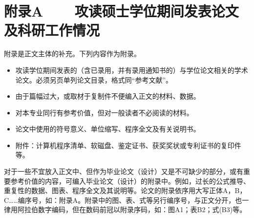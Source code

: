 \chapter*{附录A~~~~攻读硕士学位期间发表论文及科研工作情况}


附录是正文主体的补充。下列内容作为附录。

\begin{itemize}
	\item 攻读学位期间发表的（含已录用，并有录用通知书的）与学位论文相关的学术论文。必须另页单列论文目录，格式同“参考文献”。
	\item 由于篇幅过大，或取材于复制件不便编入正文的材料、数据。
	\item 对本专业同行有参考价值，但对一般读者不必阅读的材料。
	\item 论文中使用的符号意义、单位缩写、程序全文及有关说明书。
	\item 附件：计算机程序清单、软磁盘、鉴定证书、获奖奖状或专利证书的复印件等。
\end{itemize}

对于一些不宜放入正文中、但作为毕业论文（设计）又是不可缺少的部分，或有重要参考价值的内容，可编入毕业论文（设计）的附录中。例如，过长的公式推导、重复性的数据、图表、程序全文及其说明等。论文的附录依序用大写正体A，B，C……编序号，如：附录A。附录中的图、表、式等另行编序号，与正文分开，也一律用阿拉伯数字编码，但在数码前冠以附录序码，如：图A1；表B2；式(B3)等。
